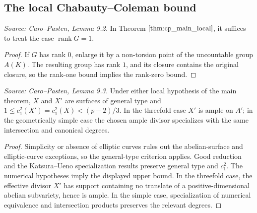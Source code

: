 \subsection{The local Chabauty--Coleman bound}

\begin{lemma}
  \label{lem:cp_rank_one_reduction}
  \textit{Source: Caro--Pasten, Lemma 9.2.}
  In Theorem \(\ref{thm:cp_main_local}\), it suffices to treat the case
  \(\operatorname{rank}G=1\).
\end{lemma}
\begin{proof}
  If \(G\) has rank \(0\), enlarge it by a non-torsion point of the uncountable
  group \(A(K)\).  The resulting group has rank \(1\), and its closure contains
  the original closure, so the rank-one bound implies the rank-zero bound.
\end{proof}

\begin{lemma}
  \label{lem:cp_main_hypotheses}
  \textit{Source: Caro--Pasten, Lemma 9.3.}
  Under either local hypothesis of the main theorem, \(X\) and \(X'\) are
  surfaces of general type and
  \(1\le c_1^2(X')=c_1^2(X)<(p-2)/3\).  In the threefold case \(X'\) is ample
  on \(A'\); in the geometrically simple case the chosen ample divisor
  specializes with the same intersection and canonical degrees.
\end{lemma}
\begin{proof}
  Simplicity or absence of elliptic curves rules out the abelian-surface and
  elliptic-curve exceptions, so the general-type criterion applies.  Good
  reduction and the Katsura--Ueno specialization results preserve general type
  and \(c_1^2\).  The numerical hypotheses imply the displayed upper bound.
  In the threefold case, the effective divisor \(X'\) has support containing no
  translate of a positive-dimensional abelian subvariety, hence is ample.  In
  the simple case, specialization of numerical equivalence and intersection
  products preserves the relevant degrees.
\end{proof}

